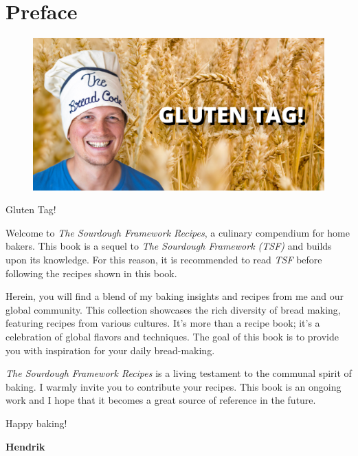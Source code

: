 \chapter{Preface}%

\begin{figure}[h]
    \centering
    \includegraphics[width=\textwidth]{gluten-tag}
\end{figure}

Gluten Tag!

Welcome to \textit{The Sourdough Framework Recipes}, a culinary compendium for
home bakers. This book is a sequel to \textit{The Sourdough Framework (TSF)} and builds upon
its knowledge. For this reason, it is recommended to read \textit{TSF} before following the recipes
shown in this book.

Herein, you will find a blend of my baking insights and recipes from me and our global
community. This collection showcases the rich diversity of bread making,
featuring recipes from various cultures. It's more than a recipe book; it's a
celebration of global flavors and techniques. The goal of this book is to provide
you with inspiration for your daily bread-making.

\textit{The Sourdough Framework Recipes} is a living testament to the communal
spirit of baking. I warmly invite you to contribute your recipes. This book
is an ongoing work and I hope that it becomes a great source of reference in the future.

\bigskip

Happy baking!

\textbf{Hendrik}

